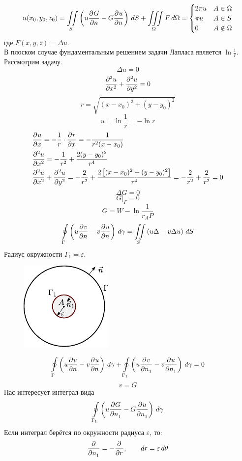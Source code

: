 \[	
	u(x_0, y_0, z_0) = \iint\limits_S \left(u \frac{\partial^{}G}{\partial n^{}} - G \frac{\partial^{}u}{\partial n^{}} \right)\, dS + \iiint\limits_\Omega F \, d\Omega = \begin{cases}
		2 \pi u &A \in \Omega\\
		\pi u & A \in S\\
		0 &  A\notin \Omega\\
	\end{cases}
\]
где $F(x, y, z) = \Delta u$.\\

В плоском случае фундаментальным решением задачи Лапласа является $\ln \frac{1}{r}$.
Рассмотрим задачу.
\[
	\Delta u = 0
\]
\[
	\frac{\partial^{2}u}{\partial x^{2}} + \frac{\partial^{2}u}{\partial y^{2}} = 0
\]
\[
	r= \sqrt{(x - x_0)^2 + (y - y_0)^2}
\]
\[
	u = \ln \frac{1}{r} = - \ln r
\]
\begin{align*}
	&\frac{\partial^{}u}{\partial x^{}} = - \frac{1}{r} \cdot \frac{\partial^{}r}{\partial x^{}} = - \frac{1}{r^2 (x - x_0)}\\
	&\frac{\partial^{2}u}{\partial x^{2}} = - \frac{1}{r^2} + \frac{2  (y - y_0)^2}{r^4}\\
	&\frac{\partial^{2}u}{\partial x^{2}} + \frac{\partial^{2}u}{\partial y^{2}} = -\frac{2}{r^2} + \frac{2 \left[ (x - x_0)^2 + (y - y_0)^2 \right]}{r^4} = - \frac{2}{r^2} + \frac{2}{r^2} = 0
\end{align*}
\[	
	\Delta G = 0
\]
\[
	G\big|_\Gamma = 0
\]
\[
	G = W - \ln \frac{1}{r_AP} 
\]
\[
	\oint\limits_\Gamma \left(u \frac{\partial^{}v}{\partial n^{}} - v \frac{\partial^{}u}{\partial n^{}} \right)\, d \gamma = \iint\limits_S \left(u \Delta - v \Delta u \right)\, dS
\]
Радиус окружности $\Gamma_1 = \varepsilon$.
\begin{figure}[h!]
	\centering
	\includegraphics{figGreenMethTwoDim.pdf}
\end{figure}
\[
	\oint\limits_\Gamma \left(u \frac{\partial^{}v}{\partial n^{}} - v \frac{\partial^{}u}{\partial n^{}} \right)\, d\gamma + \oint\limits_{\Gamma_1} \left(u \frac{\partial^{}v}{\partial n_1^{}} - v \frac{\partial^{}u}{\partial n_1^{}} \right)\, d\gamma = 0
\]
\[
	v = G
\]
Нас интересует интеграл вида
\[
	\oint\limits_{\Gamma_1} \left(u \frac{\partial^{}G}{\partial n_1^{}} - G \frac{\partial^{}u}{\partial n_1^{}} \right)\, d\gamma
\]
Если интеграл берётся по окружности радиуса $\varepsilon$, то:
\[
	\frac{\partial^{}}{\partial n_1^{}} = - \frac{\partial^{}}{\partial r^{}}, \qquad dr = \varepsilon\, d\theta
\]
